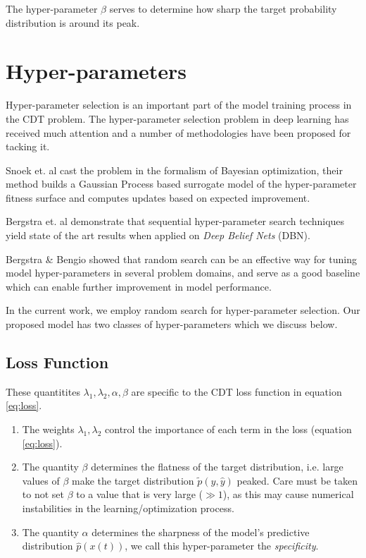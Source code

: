 \documentclass[runningheads]{llncs}
\begin{document}
The hyper-parameter $\beta$ serves to determine how sharp the target probability distribution is 
around its peak.


\section{Hyper-parameters}

Hyper-parameter selection is an important part of the model training process in the CDT problem. 
The hyper-parameter selection problem in deep learning has received much attention and a number 
of methodologies have been proposed for tacking it. 

Snoek et. al \cite{snoek2012practical} cast the problem in the formalism of Bayesian optimization, their method 
builds a Gaussian Process based surrogate model of the hyper-parameter fitness surface and computes 
updates based on expected improvement. 


Bergstra et. al \cite{hypBengio} demonstrate that sequential hyper-parameter search techniques yield state of the art 
results when applied on \emph{Deep Belief Nets} (DBN). 

Bergstra \& Bengio \cite{randomsearchBengio} showed that random search can be an effective way for tuning model 
hyper-parameters in several problem domains, and serve as a good baseline which can enable 
further improvement in model performance.

In the current work, we employ random search for hyper-parameter selection. 
Our proposed model has two classes of hyper-parameters which we discuss below.

\subsection{Loss Function}

These quantitites $\lambda_1, \lambda_2, \alpha, \beta$ are specific to the CDT loss function in equation 
\ref{eq:loss}. 

\begin{enumerate}
\item The weights $\lambda_1, \lambda_2$ control the importance of each term in the loss (equation \ref{eq:loss}).
\item The quantity $\beta$ determines the flatness of the target distribution, i.e. large values of $\beta$ 
      make the target distribution $\tilde{p}(y, \hat{y})$ peaked. Care must be taken to not set $\beta$ to a value
      that is very large ($\gg 1$), as this may cause numerical instabilities in the learning/optimization process.
\item The quantity $\alpha$ determines the sharpness of the model's predictive distribution $\hat{p}(x(t))$, 
      we call this hyper-parameter the \emph{specificity}.        
\end{enumerate}
 
\end{document}
